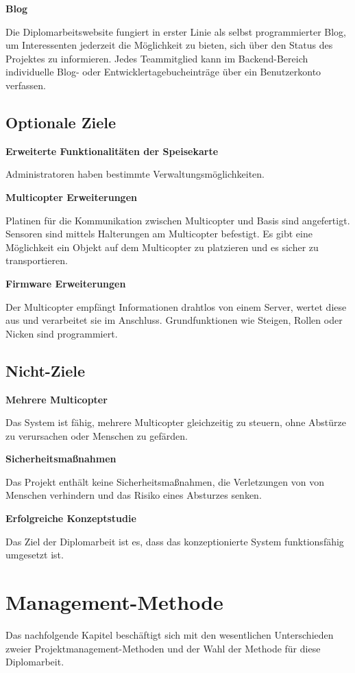   \textbf{Blog}

  Die Diplomarbeitswebsite fungiert in erster Linie als selbst programmierter Blog, um Interessenten
  jederzeit die Möglichkeit zu bieten, sich über den Status des Projektes zu informieren. Jedes Teammitglied
  kann im Backend-Bereich individuelle Blog- oder Entwicklertagebucheinträge über ein Benutzerkonto verfassen.

  \subsection{Optionale Ziele}
  \textbf{Erweiterte Funktionalitäten der Speisekarte}

  Administratoren haben bestimmte Verwaltungsmöglichkeiten.

  \textbf{Multicopter Erweiterungen}

  Platinen für die Kommunikation zwischen Multicopter und Basis sind angefertigt.
  Sensoren sind mittels Halterungen am Multicopter befestigt.
  Es gibt eine Möglichkeit ein Objekt auf dem Multicopter zu platzieren und es sicher zu transportieren.

  \textbf{Firmware Erweiterungen}

  Der Multicopter empfängt Informationen drahtlos von einem Server,
  wertet diese aus und verarbeitet sie im Anschluss.
  Grundfunktionen wie Steigen, Rollen oder Nicken sind programmiert.

  \subsection{Nicht-Ziele}
  \textbf{Mehrere Multicopter}

  Das System ist fähig, mehrere Multicopter gleichzeitig zu steuern, ohne Abstürze
  zu verursachen oder Menschen zu gefärden.

  \textbf{Sicherheitsmaßnahmen}

  Das Projekt enthält keine Sicherheitsmaßnahmen, die Verletzungen von von Menschen
  verhindern und das Risiko eines Absturzes senken.

  \textbf{Erfolgreiche Konzeptstudie}

  Das Ziel der Diplomarbeit ist es, dass das konzeptionierte System
  funktionsfähig umgesetzt ist.

\section{Management-Methode}
Das nachfolgende Kapitel beschäftigt sich mit den wesentlichen Unterschieden
zweier Projektmanagement-Methoden und der Wahl der Methode für diese Diplomarbeit.

